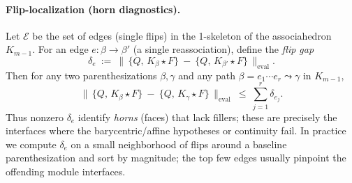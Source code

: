 \documentclass[11pt]{article}
\numberwithin{equation}{section}
\theoremstyle{upright}
\begin{document}
\paragraph{Flip-localization (horn diagnostics).}
Let $\mathcal E$ be the set of edges (single flips) in the 1-skeleton of the associahedron
$K_{m-1}$. For an edge $e:\beta\to\beta'$ (a single reassociation), define the \emph{flip gap}
\begin{equation}\label{eq:flip-gap}
\delta_e\ :=\
\Big\|\,\{Q,\,K_{\beta}\star F\}\ -\ \{Q,\,K_{\beta'}\star F\}\,\Big\|_{\mathrm{eval}}.
\end{equation}
Then for any two parenthesizations $\beta,\gamma$ and any path
$\beta=e_1\cdots e_r\leadsto \gamma$ in $K_{m-1}$,
\begin{equation}\label{eq:telescoping}
\Big\|\,\{Q,\,K_{\beta}\star F\}\ -\ \{Q,\,K_{\gamma}\star F\}\,\Big\|_{\mathrm{eval}}
\ \le\ \sum_{j=1}^r \delta_{e_j}.
\end{equation}
Thus nonzero $\delta_e$ identify \emph{horns} (faces) that lack fillers; these are
precisely the interfaces where the barycentric/affine hypotheses or continuity fail.
In practice we compute $\delta_e$ on a small neighborhood of flips around a baseline
parenthesization and sort by magnitude; the top few edges usually pinpoint the offending
module interfaces.
\end{document}

